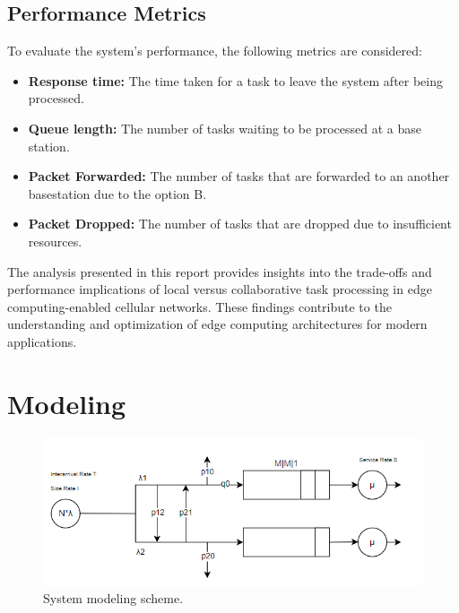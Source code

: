 \documentclass{report}
\begin{document}
\section{Performance Metrics}

To evaluate the system's performance, the following metrics are considered:
\begin{itemize}
    \item \textbf{Response time:} The time taken for a task to leave the system after being processed.
    \item \textbf{Queue length:} The number of tasks waiting to be processed at a base station.
    \item \textbf{Packet Forwarded:} The number of tasks that are forwarded to an another basestation due to the option B.
    \item \textbf{Packet Dropped:} The number of tasks that are dropped due to insufficient resources.
\end{itemize}
The analysis presented in this report provides insights into the trade-offs and performance implications of local versus collaborative task processing in edge computing-enabled cellular networks. These findings contribute to the understanding and optimization of edge computing architectures for modern applications.

\chapter{Modeling}

\begin{figure}[H]
    \centering
    \includegraphics[width=\textwidth]{img/immagine.png}
    \caption{System modeling scheme.}
    \label{scheme}
\end{figure}
\end{document}
